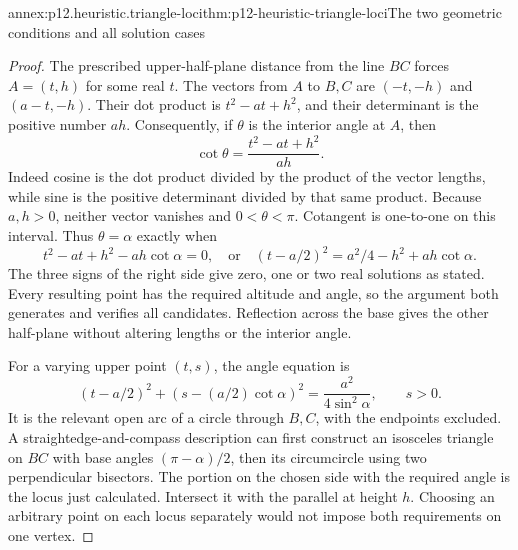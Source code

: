 \begin{annexitem}{annex:p12.heuristic.triangle-loci}{thm:p12-heuristic-triangle-loci}{The two geometric conditions and all solution cases}
\begin{proof}
The prescribed upper-half-plane distance from the line \(BC\)
forces \(A=(t,h)\) for some real \(t\). The vectors from
\(A\) to \(B,C\) are \((-t,-h)\) and \((a-t,-h)\).
Their dot product is \(t^2-at+h^2\), and their determinant
is the positive number \(ah\). Consequently, if \(\theta\)
is the interior angle at \(A\), then
\[
              \cot\theta=\frac{t^2-at+h^2}{ah}.
\]
Indeed cosine is the dot product divided by the product of the
vector lengths, while sine is the positive determinant divided
by that same product. Because \(a,h>0\), neither vector vanishes
and \(0<\theta<\pi\). Cotangent is one-to-one on this interval.
Thus \(\theta=\alpha\) exactly when
\[
 t^2-at+h^2-ah\cot\alpha=0,
 \quad\text{or}\quad
 (t-a/2)^2=a^2/4-h^2+ah\cot\alpha.
\]
The three signs of the right side give zero, one or two real
solutions as stated. Every resulting point has the required
altitude and angle, so the argument both generates and verifies
all candidates. Reflection across the base gives the other
half-plane without altering lengths or the interior angle.

For a varying upper point \((t,s)\), the angle equation is
\[
 (t-a/2)^2+(s-(a/2)\cot\alpha)^2
                =\frac{a^2}{4\sin^2\alpha},\qquad s>0.
\]
It is the relevant open arc of a circle through \(B,C\), with
the endpoints excluded. A straightedge-and-compass description
can first construct an isosceles triangle on \(BC\) with base
angles \((\pi-\alpha)/2\), then its circumcircle using two
perpendicular bisectors. The portion on the chosen side with
the required angle is the locus just calculated. Intersect it
with the parallel at height \(h\). Choosing an arbitrary point
on each locus separately would not impose both requirements on
one vertex.
\end{proof}
\end{annexitem}


